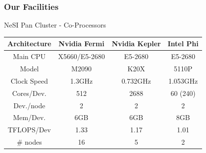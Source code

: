 \documentclass{beamer}
\begin{document}
{
  \frametitle{Our Facilities}
      \begin{block}{NeSI Pan Cluster - Co-Processors}
      \begin{center}
       \begin{small}
      \begin{tabular}{|c|c|c|c|}
      \hline 
      \textbf{Architecture} & \textbf{Nvidia Fermi} & \textbf{Nvidia Kepler} & \textbf{Intel Phi} \\ 
      \hline 
      Main CPU                  &  X5660/E5-2680       &  E5-2680                   &  E5-2680 \\
      \hline 
      Model                       &  M2090                     &   K20X                       &  5110P \\ 
      \hline 
      Clock Speed             &  1.3GHz                    &  0.732GHz                      &  1.053GHz\\ 
      \hline 
      Cores/Dev.             & 512                            & 2688                           & 60 (240) \\ 
      \hline       
      Dev./node              &  2                             &   2                                &  2  \\ 
      \hline 
      Mem/Dev.             & 6GB                          & 6GB                               & 8GB  \\ 
      \hline 
      TFLOPS/Dev         & 1.33                          & 1.17                              & 1.01 \\ 
      \hline 
      \# nodes               & 16                             & 5                                 & 2 \\ 
      \hline 
      \end{tabular} 
      \end{small}
      \end{center}
  \end{block}
}
\end{document}
